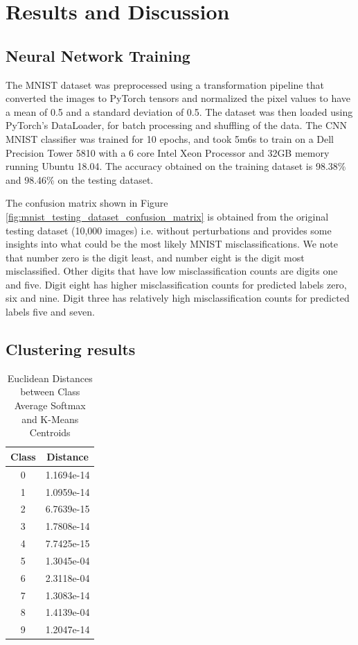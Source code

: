 
\section{Results and Discussion}

\subsection{Neural Network Training}

The MNIST dataset was preprocessed using a transformation pipeline that converted the images to PyTorch tensors and normalized the pixel values to have a mean of 0.5 and a standard deviation of 0.5. The dataset was then loaded using PyTorch's DataLoader, for batch processing and shuffling of the data. The CNN MNIST classifier was trained for 10 epochs, and took 5m6s to train on a Dell Precision Tower 5810 with a 6 core Intel Xeon Processor and 32GB memory running Ubuntu 18.04. The accuracy obtained on the training dataset is 98.38\% and 98.46\% on the testing dataset.

The confusion matrix shown in Figure \ref{fig:mnist_testing_dataset_confusion_matrix} is obtained from the original testing dataset (10,000 images) i.e. without perturbations and provides some insights into what could be the most likely MNIST misclassifications. We note that number zero is the digit least, and number eight is the digit most misclassified. Other digits that have low misclassification counts are digits one and five. Digit eight has higher misclassification counts for predicted labels zero, six and nine. Digit three has relatively high misclassification counts for predicted labels five and seven.


\subsection{Clustering results}

\begin{table}[htbp]
\centering
\caption{Euclidean Distances between Class Average Softmax and K-Means Centroids}
\label{tab:diff_softmax_avg_dist_to_centroids}
\begin{tabular}{|c|c|}
\hline
Class & Distance \\
\hline
0 & 1.1694e-14 \\
\hline
1 & 1.0959e-14 \\
\hline
2 & 6.7639e-15 \\
\hline
3 & 1.7808e-14 \\
\hline
4 & 7.7425e-15 \\
\hline
5 & 1.3045e-04 \\
\hline
6 & 2.3118e-04 \\
\hline
7 & 1.3083e-14 \\
\hline
8 & 1.4139e-04 \\
\hline
9 & 1.2047e-14 \\
\hline
\end{tabular}
\end{table}

